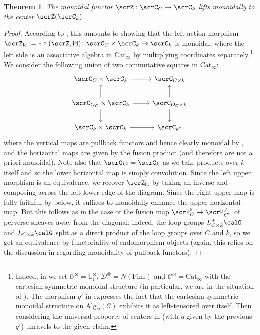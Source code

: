 \documentclass[10pt, reqno]{amsart}
\theoremstyle{plain}
\newtheorem{theorem}{Theorem}[section]
\theoremstyle{definition}
\numberwithin{equation}{section}
\begin{document}
	
	
	\begin{theorem}\label{thm_assoc_center}
		The monoidal functor $\scrZ: \scrC_C \to \scrC_k$ lifts monoidally to the center $\scrZ(\scrC_k)$.
	\end{theorem}
	
	\begin{proof}
		According to \cite[Definition 5.3.1.12]{Lur17}, this amounts to showing that the left action morphism $\scrZ_{\mathrm{lc}}:=\ast \circ (\scrZ,\mathrm{id})\colon \scrC_C\times \scrC_k \to \scrC_k$ is monoidal, where the left side is an associative algebra in $\mathrm{Cat}_\infty$ by multiplying coordinates separately.\footnote{Indeed, in \cite[Definition 5.3.1.12]{Lur17} we set $\mathcal{O}^\otimes=\mathbb{E}_1^\otimes$, $\mathcal{D}^\otimes=N(\mathrm{Fin}_\ast)$ and $\mathcal{C}^\otimes=\mathrm{Cat}_\infty$ with the cartesian symmetric monoidal structure (in particular, we are in the situation of \cite[Remark 5.3.1.13]{Lur17}). The morphism $q'$ in \cite[Definition 5.3.1.12]{Lur17} expresses the fact that the cartesian symmetric monoidal structure on $\mathrm{Alg}_{\mathcal{O}}(\mathcal{C})$ exhibits it as left-tensored over itself. Then considering the universal property of centers in \cite[Definition 5.3.1.6]{Lur17} (with $q$ given by the previous $q'$) unravels to the given claim.} We consider the following union of two commutative squares in $\mathrm{Cat}_\infty$:
		\begin{equation}\label{eq_diagram_central}\begin{tikzcd}
				\scrC_C\times \scrC_k& \scrC_{C\times k}\\
				\scrC_{O_C} \times \scrC_{k}& \scrC_{O_C\times k}\\
				\scrC_{k} \times \scrC_k & \scrC_{k^2} 
				\arrow[from=2-2, to=1-2]
				\arrow[from=2-1, to=1-1]
				\arrow[from=1-1, to=1-2]
				\arrow[from=2-1, to=2-2]
				\arrow[from=2-1, to=3-1]
				\arrow[from=2-2, to=3-2]
				\arrow[from=3-1, to=3-2]
			\end{tikzcd}
		\end{equation}
		where the vertical maps are pullback functors and hence clearly monoidal by , and the horizontal maps are given by the fusion product (and therefore are not a priori monoidal). Note also that $\scrC_{k^2}=\scrC_k$ as we take products over $k$ itself and so the lower horizontal map is simply convolution. Since the left upper morphism is an equivalence, we recover $\scrZ_{\mathrm{lc}}$ by taking an inverse and composing across the left lower edge of the diagram. Since the right upper map is fully faithful by  below, it suffices to monoidally enhance the upper horizontal map. But this follows as in the case of the fusion map $\scrP_C^2 \to \scrP_{C^2}^{\neq}$ of perverse sheaves away from the diagonal: indeed, the loop groups $L^+_{C\times k}\calG$ and $L_{C\times k}\calG$ split as a direct product of the loop groups over $C$ and $k$, so we get an equivalence by functoriality of endomorphism objects (again, this relies on the discussion in  regarding monoidality of pullback functors).
	\end{proof}
	
\end{document}
